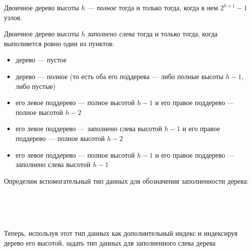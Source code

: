 \begin{definition}
Двоичное дерево высоты $h$ — \emph{полное} тогда и только тогда,
когда в нем $2^{h+1} - 1$ узлов.

Двоичное дерево высоты $h$ \emph{заполнено слева} тогда и только тогда,
когда выполняется ровно один из пунктов:
  \begin{itemize}
    \item дерево — пустое
    \item дерево — полное (то есть оба его поддерева — либо полные высоты $h-1$, либо пустые)
    \label{def:fill-nd}
    \item его левое поддерево — полное высотой $h-1$ и его правое поддерево — полное высотой $h-2$
    \item его левое поддерево — заполнено слева высотой $h-1$ и его правое поддерево — полное высотой $h-2$
    \item его левое поддерево — полное высотой $h-1$ и его правое поддерево — заполнено слева высотой $h-1$
  \end{itemize}
\end{definition}
Определим вспомогательный тип данных для обозначения заполненности дерева:
\begin{code}\>\<%
\\
\>  \AgdaSymbol{:}  \<%
\\
\>[0]\<[2]%
\>[2]  \AgdaSymbol{:} \<%
\\
\>\<\end{code}
Теперь, используя этот тип данных как дополнительный индекс и
индексируя дерево его высотой, задать тип данных для заполненного слева дерева
